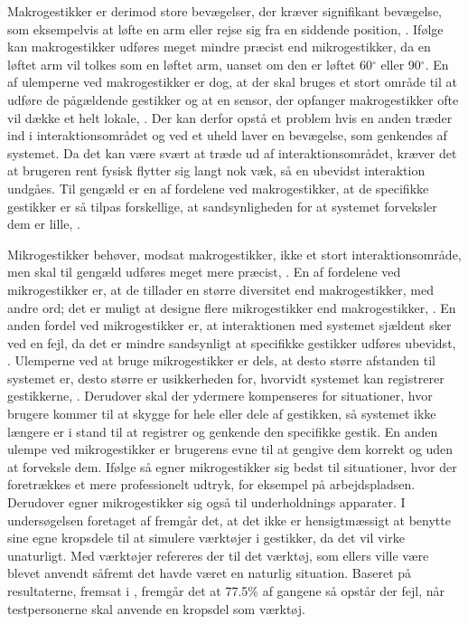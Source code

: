 Makrogestikker er derimod store bevægelser, der kræver signifikant bevægelse, som eksempelvis at løfte en arm eller rejse sig fra en siddende position, \parencite[s. 6]{PDF:UsabilityofMicroVsMacroGestures}. Ifølge \textcite[s. 9]{PDF:UsabilityofMicroVsMacroGestures} kan makrogestikker udføres meget mindre præcist end mikrogestikker, da en løftet arm vil tolkes som en løftet arm, uanset om den er løftet 60$^{\circ}$ eller 90$^{\circ}$. En af ulemperne ved makrogestikker er dog, at der skal bruges et stort område til at udføre de pågældende gestikker og at en sensor, der opfanger makrogestikker ofte vil dække et helt lokale, \parencite[s. 9]{PDF:UsabilityofMicroVsMacroGestures}. Der kan derfor opstå et problem hvis en anden træder ind i interaktionsområdet og ved et uheld laver en bevægelse, som genkendes af systemet. Da det kan være svært at træde ud af interaktionsområdet, kræver det at brugeren rent fysisk flytter sig langt nok væk, så en ubevidst interaktion undgåes. Til gengæld er en af fordelene ved makrogestikker, at de specifikke gestikker er så tilpas forskellige, at sandsynligheden for at systemet forveksler dem er lille, \parencite[s. 9]{PDF:UsabilityofMicroVsMacroGestures}.  

Mikrogestikker behøver, modsat makrogestikker, ikke et stort interaktionsområde, men skal til gengæld udføres meget mere præcist, \parencite[s. 10]{PDF:UsabilityofMicroVsMacroGestures}. En af fordelene ved mikrogestikker er, at de tillader en større diversitet end makrogestikker, med andre ord; det er muligt at designe flere mikrogestikker end makrogestikker, \parencite[s. 10]{PDF:UsabilityofMicroVsMacroGestures}. En anden fordel ved mikrogestikker er, at interaktionen med systemet sjældent sker ved en fejl, da det er mindre sandsynligt at specifikke gestikker udføres ubevidst, \parencite[s. 10]{PDF:UsabilityofMicroVsMacroGestures}. Ulemperne ved at bruge mikrogestikker er dels, at desto større afstanden til systemet er, desto større er usikkerheden for, hvorvidt systemet kan registrerer gestikkerne, \parencite[s. 10]{PDF:UsabilityofMicroVsMacroGestures}. Derudover skal der ydermere kompenseres for situationer, hvor brugere kommer til at skygge for hele eller dele af gestikken, så systemet ikke længere er i stand til at registrer og genkende den specifikke gestik. En anden ulempe ved mikrogestikker er brugerens evne til at gengive dem korrekt og uden at forveksle dem. Ifølge \textcite[s. 10]{PDF:UsabilityofMicroVsMacroGestures} så egner mikrogestikker sig bedst til situationer, hvor der foretrækkes et mere professionelt udtryk, for eksempel på arbejdspladsen. Derudover egner mikrogestikker sig også til underholdnings apparater.\blankline
%
I undersøgelsen foretaget af \textcite[s. 823]{PDF:UnderstandingNaturalness} fremgår det, at det ikke er hensigtmæssigt at benytte sine egne kropsdele til at simulere værktøjer i gestikker, da det vil virke unaturligt. Med værktøjer refereres der til det værktøj, som ellers ville være blevet anvendt såfremt det havde været en naturlig situation. Baseret på resultaterne, fremsat i \textcite[s. 823]{PDF:UnderstandingNaturalness}, fremgår det at 77.5\% af gangene så opstår der fejl, når testpersonerne skal anvende en kropsdel som værktøj.

